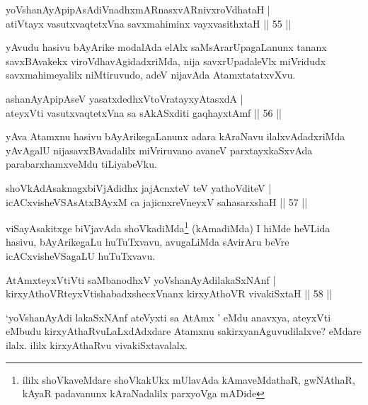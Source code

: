 
\begin{shl}
yoV\s shanAyApipAsAdiVnadhxmARnasxvARnivxroVdhataH |\\
atiVtayx vasutxvaqtetxVna savxmahiminx vayxvasithxtaH \hfill || 55 ||
\end{shl}

\begin{artha}
yAvudu hasivu bAyArike modalAda elAlx saMsArarUpagaLanunx tananx savxBAvakekx viroVdhavAgidadxriMda, nija savxrUpadaleVlx miVridudx savxmahimeyalilx niMtiruvudo, adeV nijavAda AtamxtatatxvXvu.
\end{artha}


\begin{shl}
ashanAyApipAseV yasatxdedhxVtoVratayxyAtasxdA |\\
ateyxVti vasutxvaqtetxVna sa sAkASxditi gaqhayxtAmf \hfill || 56 ||
\end{shl}

\begin{artha}
yAva Atamxnu hasivu bAyArikegaLanunx adara kAraNavu ilalxvAdadxriMda yAvAgalU nijasavxBAvadalilx miVriruvano avaneV parxtayxkaSxvAda parabarxhamxveMdu tiLiyabeVku.
\end{artha}

\begin{shl}
shoVkAdAsaknagxbiVjAdidhx jajAcnxteV teV yathoVditeV |\\
icACxvisheVSAsAtxBAyxM ca jajicnxreV\s neyxV sahasarxshaH \hfill || 57 ||
\end{shl}

\begin{artha}
viSayAsakitxge biVjavAda shoVkadiMda\footnote{ililx shoVkaveMdare shoVkakUkx mUlavAda kAmaveMdathaR, gwNAthaR, kAyaR padavanunx kAraNadalilx parxyoVga mADide} (kAmadiMda) I hiMde heVLida hasivu, bAyArikegaLu huTuTxvavu, avugaLiMda sAvirAru beVre icACxvisheVSagaLU huTuTxvavu.
\end{artha}


\begin{shl}
AtAmx\s teyxVtiVti saMbanodhxV yoV\s shanAyAdilakaSxNAnf |\\
kirxyAthoVR\s teyxVtishabadxshecxVnanx kirxyAthoVR vivakiSxtaH \hfill || 58 ||
\end{shl}

\begin{artha}
`yoV\s shanAyAdi lakaSxNAnf ateVyxti sa AtAmx ' eMdu anavxya, ateyxVti eMbudu kirxyAthaRvuLaLxdAdxdare Atamxnu sakirxyanAgu\-\break vudilalxve? eMdare ilalx. ililx kirxyAthaRvu vivakiSxtavalalx. 
\end{artha}

